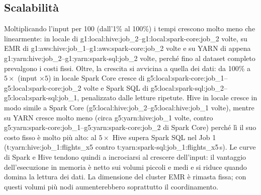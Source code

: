 \documentclass[11pt,a4paper]{article}
\newcommand{\T}[4]{\csname t:#1:#2:#3:#4\endcsname}
\newcommand{\GU}[3]{\csname g1:#1:#2:#3\endcsname}
\newcommand{\GC}[3]{\csname g5:#1:#2:#3\endcsname}
\begin{document}
\subsection{Scalabilità}
Moltiplicando l'input per 100 (dall'1\% al 100\%) i tempi crescono molto meno che linearmente: in locale di
\GU{local}{hive}{job_2}--\GU{local}{spark-core}{job_2} volte, su EMR di \GU{aws}{hive}{job_1}--\GU{aws}{spark-core}{job_2}
volte e su YARN di appena \GU{yarn}{hive}{job_2}--\GU{yarn}{spark-sql}{job_2} volte,
perché fino al dataset completo prevalgono i costi fissi. Oltre, la crescita si avvicina a quella dei dati: da 100\% a $5\times$ (input $\times 5$) in locale
Spark Core cresce di \GC{local}{spark-core}{job_1}--\GC{local}{spark-core}{job_2} volte e Spark SQL di
\GC{local}{spark-sql}{job_2}--\GC{local}{spark-sql}{job_1}, penalizzato dalle letture ripetute. Hive in locale cresce
in modo simile a Spark Core (\GC{local}{hive}{job_2}--\GC{local}{hive}{job_1} volte), mentre su YARN cresce molto meno
(circa \GC{yarn}{hive}{job_1} volte, contro \GC{yarn}{spark-core}{job_1}--\GC{yarn}{spark-core}{job_2} di
Spark Core) perché lì il suo costo fisso è molto più alto: al $5\times$ Hive supera Spark SQL nel Job 1
(\T{yarn}{hive}{job_1}{flights_x5} contro \T{yarn}{spark-sql}{job_1}{flights_x5}\,s). Le curve di Spark e Hive tendono
quindi a incrociarsi al crescere dell'input: il vantaggio dell'esecuzione in memoria è netto sui volumi piccoli e
medi e si riduce quando domina la lettura dei dati. La dimensione del cluster EMR è rimasta fissa; con questi volumi
più nodi aumenterebbero soprattutto il coordinamento.
\end{document}
